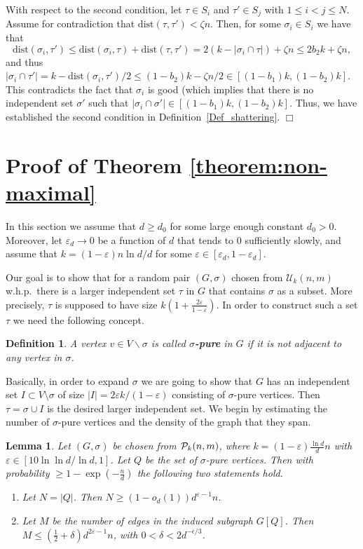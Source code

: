 \documentclass[a4paper,10pt]{article}
\newcommand{\qed}{\hfill$\Box$\smallskip}
\newtheorem{definition}{Definition}\renewcommand{\thedefinition}{\arabic{definition}}
\newtheorem{lemma}{Lemma}\renewcommand{\thelemma}{\arabic{lemma}}
\newcommand\dist{\mathrm{dist}}
\newcommand\cU{\mathcal{U}}
\newcommand\eps{\varepsilon}
\newcommand\ra{\rightarrow}
\newcommand\brk[1]{\left\lbrack{#1}\right\rbrack}
\newcommand{\whp}{w.h.p.}
\begin{document}
With respect to the second condition, let $\tau\in S_i$ and $\tau'\in S_j$
with $1\leq i<j\leq N$. Assume for contradiction that $\dist(\tau,\tau')<\zeta n$.
Then, for some $\sigma_i\in S_i$ we have that
	$$\dist(\sigma_i,\tau')\leq\dist(\sigma_i,\tau)+\dist(\tau,\tau')
		=2(k-|\sigma_i\cap\tau|)+\zeta n\leq 2b_2k+\zeta n,$$
and thus $|\sigma_i\cap\tau'|=k-\dist(\sigma_i,\tau')/2\leq (1-b_2)k-\zeta n/2\in\brk{(1-b_1)k,(1-b_2)k}$.
This contradicts the fact that $\sigma_i$ is good (which implies that there is no
	independent set $\sigma'$ such that $|\sigma_i\cap\sigma'|\in\brk{(1-b_1)k,(1-b_2)k}$.
Thus, we have established the second condition in Definition~\ref{Def_shattering}.
\qed









\section{Proof of Theorem \ref{theorem:non-maximal}}\label{section:theorem:non-maximal}


In this section we assume that $d\geq d_0$ for some large enough constant $d_0>0$.
Moreover, let $\eps_d\ra0$ be a function of $d$ that tends to $0$ sufficiently slowly,
and assume that $k=(1-\eps)n\ln d/d$ for some $\eps\in\brk{\eps_d,1-\eps_d}$.

Our goal is to show that for a random pair $(G,\sigma)$ chosen from $\cU_k(n,m)$
\whp\ there is a larger independent set $\tau$ in $G$ that contains $\sigma$ as a subset.
More precisely, $\tau$ is supposed to have size $k(1+\frac{2\eps}{1-\eps})$.
In order to construct such a set $\tau$ we need the following concept.

\begin{definition}
A vertex $v\in V\backslash \sigma$ is called {\bf $\sigma$-pure} in $G$ if it is not adjacent to any vertex in $\sigma$.
\end{definition}
Basically, in order to expand $\sigma$ we are going to show that $G$ has an independent set $I\subset V\setminus\sigma$
of size $|I|=2\eps k/(1-\eps)$  consisting of $\sigma$-pure vertices.
Then $\tau=\sigma\cup I$ is the desired larger independent set.
We begin by estimating the number of $\sigma$-pure vertices and the density of the graph
that they span.




\begin{lemma}\label{lemma:pure-graph}
Let $(G, \sigma)$ be chosen from ${\cal P}_k(n,m)$,
	where
		 $k=(1-\eps)\frac{\ln d}{d}n$ with $\eps \in [10\ln\ln d/\ln d, 1]$. 
Let $Q$ be the set of $\sigma$-pure vertices.
Then with probability $\geq1-\exp \left(-\frac{n}{d}\right)$ the following two statements hold.
\begin{enumerate}
\item Let $N=|Q|$. Then $N\geq(1-o_d(1))d^{\eps-1}n$.
\item Let $M$ be the number of edges in the induced subgraph $G\brk Q$.
	Then $M\leq (\frac12+\delta)d^{2\eps-1}n$, with $0<\delta<2d^{-\epsilon/3}$.
\end{enumerate}
\end{lemma}
\end{document}
